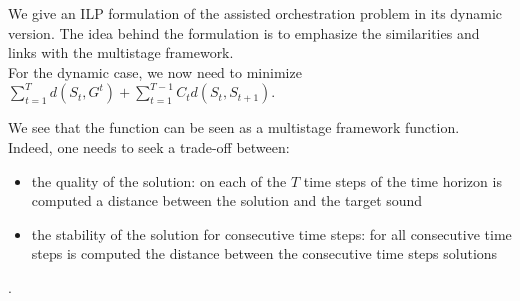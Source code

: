 \documentclass[a4paper]{book}
\begin{document}
We give an ILP formulation of the assisted orchestration problem in its dynamic version. The idea behind the formulation is to emphasize the similarities and links with the multistage framework.\\
For the dynamic case, we now need to minimize $\sum_{t=1}^T d(S_t,G^t)+\sum_{t=1}^{T-1} C_t d(S_t,S_{t+1})$. 

 

We see that the function can be seen as a multistage framework function. \\
Indeed, one needs to seek a trade-off between:
\begin{itemize}
    \item the quality of the solution: on each of the $T$ time steps of the time horizon is computed a distance between the solution and the target sound
    \item the stability of the solution for consecutive time steps: for all consecutive time steps is computed the distance between the consecutive time steps solutions
\end{itemize}. 
\end{document}
